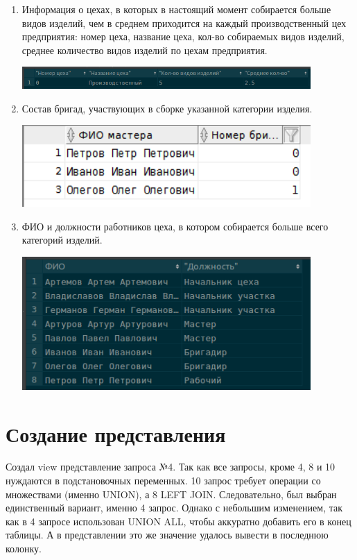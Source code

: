 \begin{enumerate}
    \item Информация о цехах, в которых в настоящий момент собирается больше видов изделий, чем в среднем приходится на каждый производственный цех предприятия: номер цеха, название цеха, кол-во собираемых видов изделий, среднее количество видов изделий по цехам предприятия.

    

    \includegraphics[width=11cm]{./screenshots/results/result8.png}

    \item Состав бригад, участвующих в сборке указанной категории изделия.

    

    \includegraphics[width=11cm]{./screenshots/results/result9.png}

    \item ФИО и должности работников цеха, в котором собирается больше всего категорий изделий.

    

    \includegraphics[width=11cm]{./screenshots/results/result10.png}

\end{enumerate}

\section{Создание представления}
Создал view представление запроса №4.
Так как все запросы, кроме 4, 8 и 10 нуждаются в подстановочных переменных.
10 запрос требует операции со множествами (именно UNION), а 8 LEFT JOIN.
Следовательно, был выбран единственный вариант, именно 4 запрос.
Однако с небольшим изменением, так как в 4 запросе использован UNION ALL, чтобы аккуратно добавить его в конец таблицы.
А в представлении это же значение удалось вывести в последнюю колонку.

